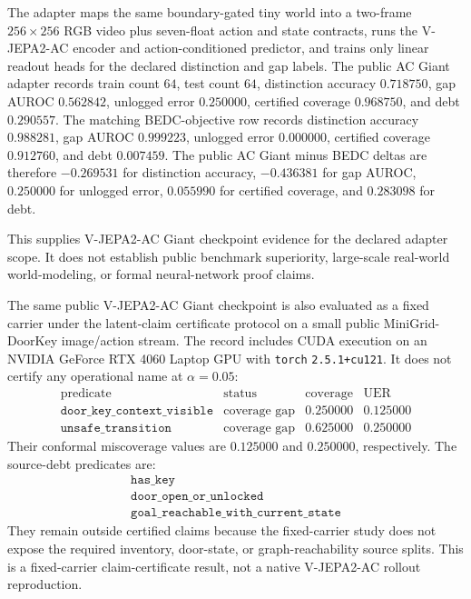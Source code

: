The adapter maps the same boundary-gated tiny world into a two-frame
$256 \times 256$ RGB video plus seven-float action and state contracts, runs
the V-JEPA2-AC encoder and action-conditioned predictor, and trains only
linear readout heads for the declared distinction and gap labels.  The public
AC Giant adapter records train count $64$, test count $64$, distinction
accuracy $0.718750$, gap AUROC $0.562842$, unlogged error $0.250000$,
certified coverage $0.968750$, and debt $0.290557$.  The matching
BEDC-objective row records distinction accuracy $0.988281$, gap AUROC
$0.999223$, unlogged error $0.000000$, certified coverage $0.912760$, and
debt $0.007459$.  The public AC Giant minus BEDC deltas are therefore
$-0.269531$ for distinction accuracy, $-0.436381$ for gap AUROC,
$0.250000$ for unlogged error, $0.055990$ for certified coverage, and
$0.283098$ for debt.

This supplies V-JEPA2-AC Giant checkpoint evidence for the declared adapter
scope.  It does not establish public benchmark superiority, large-scale
real-world world-modeling, or formal neural-network proof claims.

The same public V-JEPA2-AC Giant checkpoint is also evaluated as a fixed
carrier under the latent-claim certificate protocol on a small public
MiniGrid-DoorKey image/action stream.  The record includes CUDA execution on
an NVIDIA GeForce RTX 4060 Laptop GPU with \texttt{torch} \texttt{2.5.1+cu121}.
It does not certify any operational name at $\alpha=0.05$:
$$
\begin{array}{lccc}
\text{predicate} & \text{status} & \text{coverage} & \text{UER}\\
\texttt{door\_key\_context\_visible} & \text{coverage gap} & 0.250000 & 0.125000\\
\texttt{unsafe\_transition} & \text{coverage gap} & 0.625000 & 0.250000
\end{array}
$$
Their conformal miscoverage values are $0.125000$ and $0.250000$,
respectively.  The source-debt predicates are:
$$
\begin{array}{l}
\texttt{has\_key}\\
\texttt{door\_open\_or\_unlocked}\\
\texttt{goal\_reachable\_with\_current\_state}
\end{array}
$$
They remain outside certified claims because the fixed-carrier study does
not expose the required inventory, door-state, or graph-reachability source
splits.  This is a fixed-carrier claim-certificate result, not a native
V-JEPA2-AC rollout reproduction.

